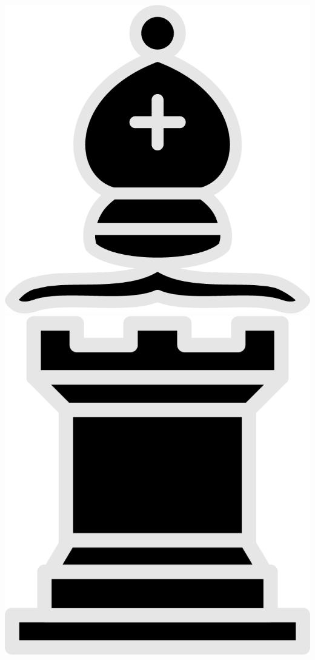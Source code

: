 \documentclass{article}
\begin{document}
\begin{center}
	\includegraphics[scale=0.07]{image1}   
	\includegraphics[scale=0.07]{image3}	

\end{center}
\end{document}
